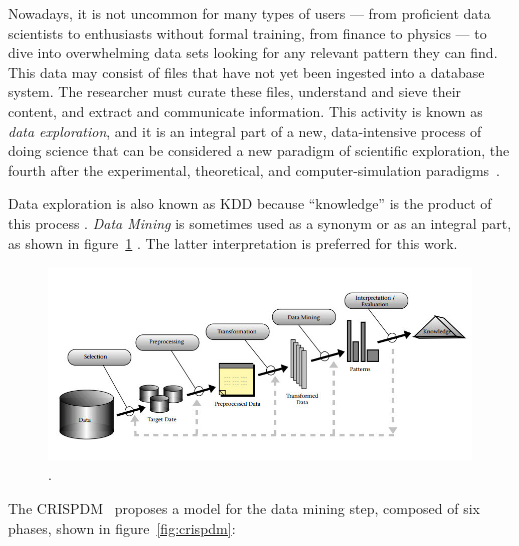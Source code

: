 
Nowadays, it is not uncommon for many types of users
--- from proficient data scientists to enthusiasts without formal
training, from finance to physics --- to dive into overwhelming
data sets looking for any relevant pattern they can find. This data
may consist of files that have not yet been ingested into a
database system. The researcher must curate
these files, understand and sieve their content, and 
extract and communicate information. This activity
is known as \emph{data exploration}, and it is an integral part
of a new, data-intensive process of doing science that
can be considered a new paradigm of scientific exploration,
the fourth after the experimental, theoretical, and computer-simulation paradigms~\cite{bell2009beyond,hey2009the}.

Data exploration is also known as \gls{KDD}
because ``knowledge'' is the product of this process
\parencite{Piatetsky-Shapiro1991,Fayyad1996a}.
\emph{Data Mining} is sometimes used as a synonym or as an integral
part, as shown in figure~\ref{fig:kdd} \cite{Fayyad1996a,Reinartz1999}.
The latter interpretation is preferred for this work. 

\begin{figure}[htbp]
    \centering
    \includegraphics[width=\linewidth]{images/1_introduction/kdd.jpg}
    \caption{.}
    \label{fig:kdd}
\end{figure}

The \gls{CRISPDM}~\cite{Shearer2000} proposes a model for the data
mining step, composed of six phases, shown in figure~\ref{fig:crispdm}:

